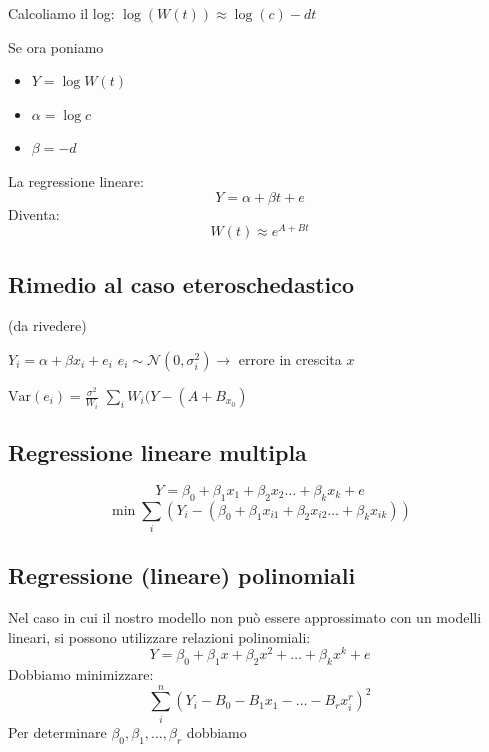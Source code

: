 \documentclass[]{article}
\begin{document}
    Calcoliamo il log:
    $\log({W}(t)) \approx \log{(c)}-dt$
    
    Se ora poniamo
    \begin{itemize}
    \item 
    $Y = \log{W(t)}$
    \item 
    $\alpha = \log{c}$
    \item 
    $\beta = -d$
    \end{itemize}
    
    La regressione lineare:
    \[
     Y = \alpha + \beta t + e 
    \]
    Diventa:
    \[
     W(t) \approx e^{A+Bt} 
    \]\subsection{Rimedio al caso eteroschedastico}\label{sec:rimedio-al-caso-eteroschedastico}
    (da rivedere)
    
    $Y_i = \alpha + \beta x_i + e_i$
    $e_i \sim \mathcal N(0,\sigma_i^2) \rightarrow$ errore in crescita $x$
    
    $\text{Var}(e_i) = \frac{\sigma^2}{W_i}$
    $\sum_i W_i(Y-(A+B_{x_0})$
    \subsection{Regressione lineare multipla}\label{sec:regressione-lineare-multipla}\[
    Y = \beta_0 + \beta_1 x_1 + \beta_2 x_2 \ldots + \beta_k x_k +e
    \]\[
     \min\sum_i(Y_i -(\beta_0+\beta_1x_{i1} + \beta_2x_{i2} \ldots + \beta_kx_{ik})) 
    \]\subsection{Regressione (lineare) polinomiali}\label{sec:regressione-lineare-polinomiali}
    Nel caso in cui il nostro modello non può essere approssimato con un modelli lineari, si possono utilizzare relazioni polinomiali:
    \[
     Y = \beta_0 + \beta_1x+\beta_2x^2 +\ldots+\beta_kx^k + e
    \]
    Dobbiamo minimizzare:
    \[
     \sum_i^n (Y_i-B_0-B_1x_1-\ldots-B_rx_i^r)^2 
    \]
    Per determinare $\beta_0, \beta_1, \ldots, \beta_r$ dobbiamo
\end{document}
